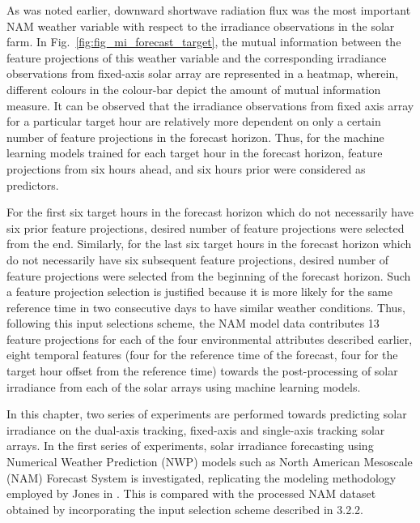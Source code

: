 \par As was noted earlier, downward shortwave radiation flux was the most important NAM weather variable with respect to the irradiance observations in the solar farm. In Fig.~\ref{fig:fig_mi_forecast_target}, the mutual information between the feature projections of this weather variable and the corresponding irradiance observations from fixed-axis solar array are represented in a heatmap, wherein, different colours in the colour-bar depict the amount of mutual information measure. It can be observed that the irradiance observations from fixed axis array for a particular target hour are relatively more dependent on only a certain number of feature projections in the forecast horizon. Thus, for the machine learning models trained for each target hour in the forecast horizon, feature projections from six hours ahead, and six hours prior were considered as predictors. 
\par For the first six target hours in the forecast horizon which do not necessarily have six prior feature projections, desired number of feature projections were selected from the end. Similarly, for the last six target hours in the forecast horizon which do not necessarily have six subsequent feature projections, desired number of feature projections were selected from the beginning of the forecast horizon. Such a feature projection selection is justified because it is more likely for the same reference time in two consecutive days to have similar weather conditions. Thus, following this input selections scheme, the NAM model data contributes 13 feature projections for each of the four environmental attributes described earlier, eight temporal features (four for the reference time of the forecast, four for the target hour offset from the reference time) towards the post-processing of solar irradiance from each of the solar arrays using machine learning models.

\par In this chapter, two series of experiments are performed towards predicting solar irradiance on the dual-axis tracking, fixed-axis and single-axis tracking solar arrays. In the first series of experiments, solar irradiance forecasting using Numerical Weather Prediction (NWP) models such as North American Mesoscale (NAM) Forecast System is investigated, replicating the modeling methodology employed by Jones in \cite{thesis_zach}. This is compared with the processed NAM dataset obtained by incorporating the input selection scheme described in 3.2.2. 


